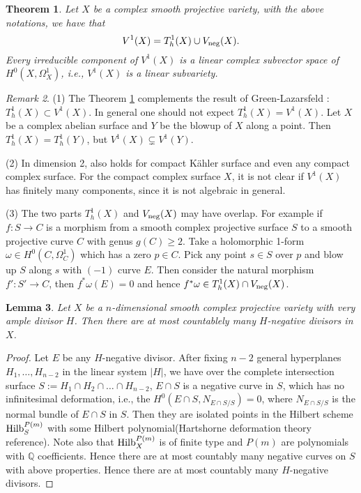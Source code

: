 \documentclass[12pt,reqno]{amsart}
\newtheorem{theorem}{Theorem}
\newtheorem{lemma}[theorem]{Lemma}
\theoremstyle{question}
\theoremstyle{definition}
\theoremstyle{remark}
\newtheorem{remark}[theorem]{Remark}
\theoremstyle{cited}
\theoremstyle{citeddef}
\newcommand{\Q}{\mathbb{Q}}
\begin{document}
\begin{theorem}\label{Thm:Proj-codim1}
 Let $X$ be a complex smooth projective variety, with the above notations, we have that 
$$V^1(X)= T_h^1(X)\cup V_{\textnormal{neg}}(X).
$$
Every irreducible component of $V^1(X)$ is a linear complex subvector space of $H^0(X, \Omega_X^1)$, i.e., $V^1(X)$ is a linear subvariety. %
\end{theorem}

\begin{remark} (1) The Theorem \ref{Thm:Proj-codim1} complements the result of Green-Lazarsfeld \cite{GL87}: $T_h^1(X) \subset V^1(X)$. In general one should not expect $T_h^1(X) = V^1(X)$. Let $X$ be a complex abelian surface and $Y$ be the blowup of $X$ along a point. Then $T_h^1(X)=T_h^1(Y)$, but  $V^1(X)\subsetneq V^1(Y)$.

(2) In dimension 2, \cite[Theorem 2]{Sp88} also holds for compact K\"ahler surface and even any compact complex surface. For the compact complex surface $X$, it is not clear if $V^1(X)$ has finitely many components, since it is not algebraic in general.

(3) The two parts $T_h^1(X)$ and $V_{\textnormal{neg}}(X)$ may have overlap. For example if $f: S\to C$ is a morphism from a smooth complex projective surface $S$ to a smooth projective curve $C$ with genus $g(C)\geq2$. Take a holomorphic 1-form $\omega\in H^0(C, \Omega_C^1)$ which has a zero $p\in C$. Pick any point $s\in S$ over $p$ and blow up $S$ along $s$ with $(-1)$ curve $E$. Then consider the natural morphism $f': S'\to C$, then $f^*\omega(E)=0$ and hence $f^*\omega\in T_h^1(X)\cap V_{\textnormal{neg}}(X)$.
\end{remark}

\begin{lemma} \label{countable} Let $X$ be a $n$-dimensional smooth complex projective variety with very ample divisor $H$. Then there are at most countablely many $H$-negative divisors in $X$.
\end{lemma}

\begin{proof}
Let $E$ be any $H$-negative divisor. After fixing $n-2$ general hyperplanes $H_1, \ldots, H_{n-2}$ in the linear system $|H|$, we have over the complete intersection surface $S:=H_1\cap H_2\cap\ldots\cap H_{n-2}$, $E\cap S$ is a negative curve in $S$, which has no infinitesimal deformation, i.e., the $H^0(E\cap S, N_{E\cap S/S})=0$, where $N_{E\cap S/S}$ is the normal bundle of $E\cap S$ in $S$. Then they are isolated points in the Hilbert scheme $\textnormal{Hilb}_S^{P(m)}$ with some Hilbert polynomial{\color{red}(Hartshorne deformation theory reference)}. Note also that $\textnormal{Hilb}_X^{P(m)}$ is of finite type and $P(m)$ are polynomials with $\Q$ coefficients. Hence there are at most countably many negative curves on $S$ with above properties. Hence there are at most countably many $H$-negative divisors.
\end{proof}
\end{document}
